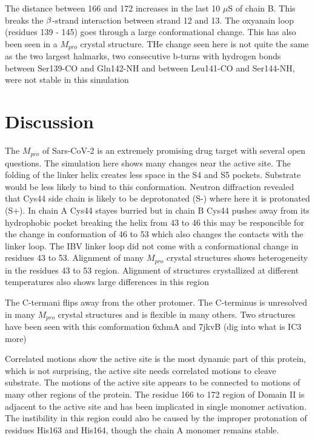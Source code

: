 \documentclass{biophys-new}
\begin{document}
The distance between 166 and 172 increases in the last 10 $\mu$S of chain B. This breaks the $\MakeUppercase{\beta}$-strand interaction between strand 12 and 13. The oxyanain loop (residues 139 - 145) goes through a large conformational change. This has also been seen in a $M_{pro}$ crystal structure. \cite{fornasier2021novel} THe change seen here is not quite the same as the two largest halmarks, two consecutive b-turns with hydrogen bonds between Ser139-CO and Gln142-NH and between Leu141-CO and Ser144-NH, were not stable in this simulation

\section*{Discussion}

The $M_{pro}$ of Sars-CoV-2 is an extremely promising drug target with several open questions. The simulation here shows many changes near the active site. The folding of the linker helix creates less space in the S4 and S5 pockets. Substrate would be less likely to bind to this conformation. Neutron diffraction revealed that Cys44 side chain is likely to be deprotonated (S-) where here it is protonated (S+)\cite{kneller2020unusual}. In chain A Cys44 stayes burried but in chain B Cys44 pushes away from its hydrophobic pocket breaking the helix from 43 to 46 this may be responcible for the change in conformation of 46 to 53 which also changes the contacts with the linker loop. The IBV linker loop did not come with a conformational change in residues 43 to 53. Alignment of many $M_{pro}$ crystal structures shows heterogeneity in the residues 43 to 53 region. \cite{jaskolski2021crystallographic} Alignment of structures crystallized at different temperatures also shows large differences in this region

The C-termani flips away from the other protomer. The C-terminus is unresolved in many $M_{pro}$ crystal structures and is flexible in many others.\cite{jaskolski2021crystallographic} Two structures have been seen with this comformation 6xhmA and 7jkvB
(dig into what is IC3 more)

Correlated motions show the active site is the most dynamic part of this protein, which is not surprising, the active site needs correlated motions to cleave substrate. The motions of the active site appears to be connected to motions of many other regions of the protein. The residue 166 to 172 region of Domain II is adjacent to the active site and has been implicated in single monomer activation. The instibility in this region could also be caused by the improper protonation of residues His163 and His164, though the chain A monomer remains stable.
\end{document}
